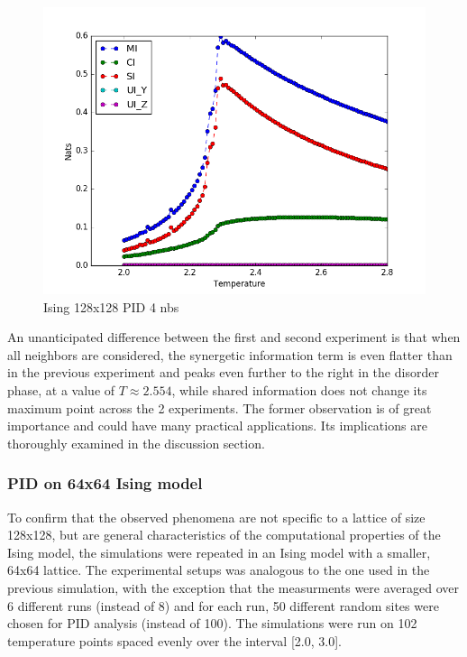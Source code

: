 \documentclass[12pt]{article}
\begin{document}
\begin{figure} [h!]
\begin{center}
\includegraphics[width=\textwidth]{ising-128-pid-4-nbs}
\caption{Ising 128x128 PID 4 nbs}
\label{fig:ising-128-pid-4-nbs}
\end{center}
\end{figure}

An unanticipated difference between the first and second experiment is that when all neighbors are considered, the synergetic information term is even flatter than in the previous experiment and peaks even further to the right in the disorder phase, at a value of $T \approx 2.554$, while shared information does not change its maximum point  across the 2 experiments. The former observation is of great importance and could have many practical applications. Its implications are thoroughly examined in the discussion section. 

\subsubsection{PID on 64x64 Ising model}

To confirm that the observed phenomena are not specific to a lattice of size 128x128, but are general characteristics of the computational properties of the Ising model, the simulations were repeated in an Ising model with a smaller, 64x64 lattice. The experimental setups was analogous to the one used in the previous simulation, with the exception that the measurments were averaged over 6 different runs (instead of 8) and for each run, 50 different random sites were chosen for PID analysis (instead of 100). The simulations were run on 102 temperature points spaced evenly over the interval [2.0, 3.0]. 
\end{document}

